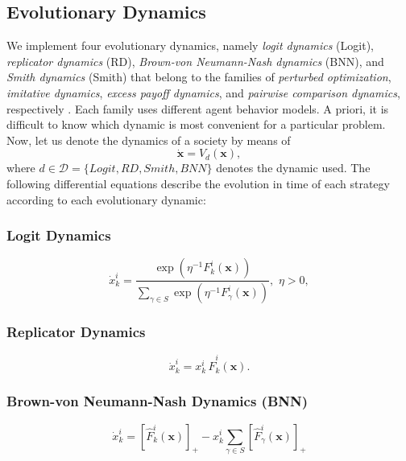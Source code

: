 \documentclass[a4paper,10pt]{article}
\newcommand{\bs}[1]{\boldsymbol{#1}}
\begin{document}
\subsection{Evolutionary Dynamics} \label{sec:dynamics}

We implement four evolutionary dynamics, namely \emph{logit dynamics} (Logit), \emph{replicator dynamics} (RD), \emph{Brown-von Neumann-Nash dynamics} (BNN), and \emph{Smith dynamics} (Smith) that belong to the families of \emph{perturbed optimization}, \emph{imitative dynamics}, \emph{excess payoff dynamics}, and \emph{pairwise comparison dynamics}, respectively \cite{hofbauer2001nash, sandholm_book}. 
%
%
Each family uses different agent behavior models. A priori, it is difficult to know which dynamic is most convenient for a particular problem. 
Now, let us denote the dynamics of a society by means of 
%
\begin{equation}
\dot{ \bs{x} } = V_d( \bs{x} ),
\end{equation}
where $d\in \mathcal{D}=\{ Logit, RD, Smith, BNN \}$ denotes the dynamic used.
The following differential equations describe the evolution in time of each strategy according to each evolutionary dynamic:
%
\subsubsection{Logit Dynamics}
\begin{equation}\label{eq:logit}
 \dot{x}_k^i = \frac{ \exp\left(\eta^{-1} F_k^i (\bs{x}) \right) }{ \sum_{\gamma \in S} \exp\left(\eta^{-1} F_\gamma^i (\bs{x}) \right) }, \, \, \eta>0,
\end{equation}

\subsubsection{Replicator Dynamics}
\begin{equation}\label{eq:replicator}
\dot{x}_k^i = x_k^i \, \hat{F}_k^i \left( \bs{x} \right).
\end{equation}

\subsubsection{Brown-von Neumann-Nash Dynamics (BNN)}
\begin{equation}\label{eq:bnn}
 \dot{x}_k^i = \left[ \hat{F}_k^i \left( \bs{x} \right) \right]_+ - x_k^i  \sum_{\gamma \in S} \left[ \hat{F}_\gamma^i \left( \bs{x} \right) \right]_+
\end{equation}
\end{document}
